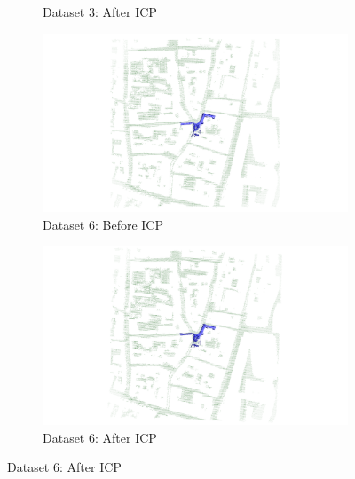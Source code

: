 \documentclass[11pt]{article}
\begin{document}
\begin{figure}[p]
\begin{subfigure}{0.45\textwidth}
            \caption{Dataset 3: After ICP}
        \end{subfigure}

        \vspace{1em}

        \begin{subfigure}{0.45\textwidth}
            \centering
            \includegraphics[width=\linewidth]{images/full/ply/5_7_1_before_icp}
            \caption{Dataset 6: Before ICP}
        \end{subfigure}
        \hfill
        \begin{subfigure}{0.45\textwidth}
            \centering
            \includegraphics[width=\linewidth]{images/full/ply/5_7_1_after_icp}
            \caption{Dataset 6: After ICP}
        \end{subfigure}

        \vspace{1em}


\end{figure}
\end{document}
